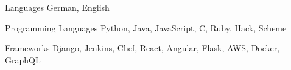 
\begin{cvskills}
\cvskill
    {Languages} %
    {German, English} %

  \cvskill
    {Programming Languages} %
    {Python, Java, JavaScript, C, Ruby, Hack, Scheme} %

  \cvskill
    {Frameworks} %
    {Django, Jenkins, Chef, React, Angular, Flask, AWS, Docker, GraphQL} %
\end{cvskills}